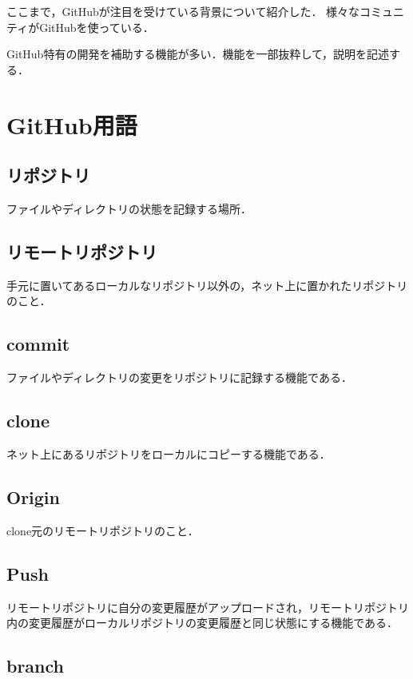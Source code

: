 ここまで，GitHubが注目を受けている背景について紹介した．
様々なコミュニティがGitHubを使っている．

GitHub特有の開発を補助する機能が多い．機能を一部抜粋して，説明を記述する．



\section{GitHub用語}

\subsection{リポジトリ}

ファイルやディレクトリの状態を記録する場所．

\subsection{リモートリポジトリ}

手元に置いてあるローカルなリポジトリ以外の，ネット上に置かれたリポジトリのこと．

\subsection{commit}

ファイルやディレクトリの変更をリポジトリに記録する機能である．


\subsection{clone}

ネット上にあるリポジトリをローカルにコピーする機能である．


\subsection{Origin}

clone元のリモートリポジトリのこと．


\subsection{Push}

リモートリポジトリに自分の変更履歴がアップロードされ，リモートリポジトリ内の変更履歴がローカルリポジトリの変更履歴と同じ状態にする機能である．


\subsection{branch}

